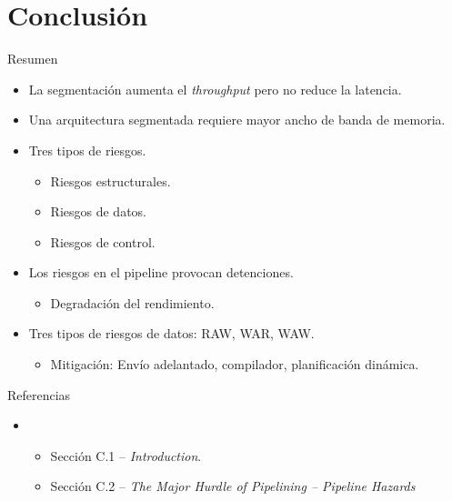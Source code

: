 \section{Conclusión}

\begin{frame}[t]{Resumen}
\begin{itemize}[<+->]
  \item La segmentación aumenta el \emph{throughput} pero no reduce la latencia.
  \item Una arquitectura segmentada requiere mayor ancho de banda de memoria.
  \item Tres tipos de riesgos.
    \begin{itemize}
      \item Riesgos estructurales.
      \item Riesgos de datos.
      \item Riesgos de control.
    \end{itemize}
  \item Los riesgos en el pipeline provocan detenciones.
    \begin{itemize}
      \item Degradación del rendimiento.
    \end{itemize}
  \item Tres tipos de riesgos de datos: RAW, WAR, WAW.
    \begin{itemize}
      \item Mitigación: Envío adelantado, compilador, planificación dinámica.
    \end{itemize}
\end{itemize}
\end{frame}


\begin{frame}[t]{Referencias}
\begin{itemize}
  \item \bibhennessy
    \begin{itemize}
      \item Sección C.1 -- \emph{Introduction}.
      \item Sección C.2 -- \emph{The Major Hurdle of Pipelining -- Pipeline Hazards}
    \end{itemize}
\end{itemize}
\end{frame}
